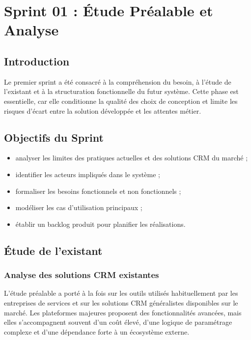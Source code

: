 \chapter{Sprint 01 : Étude Préalable et Analyse}
\minitoc
\newpage

\section{Introduction}
Le premier sprint a été consacré à la compréhension du besoin, à l'étude de l'existant et à la structuration fonctionnelle du futur système. Cette phase est essentielle, car elle conditionne la qualité des choix de conception et limite les risques d'écart entre la solution développée et les attentes métier.

\section{Objectifs du Sprint}
\begin{itemize}
    \item analyser les limites des pratiques actuelles et des solutions CRM du marché ;
    \item identifier les acteurs impliqués dans le système ;
    \item formaliser les besoins fonctionnels et non fonctionnels ;
    \item modéliser les cas d'utilisation principaux ;
    \item établir un backlog produit pour planifier les réalisations.
\end{itemize}

\section{Étude de l'existant}

\subsection{Analyse des solutions CRM existantes}
L'étude préalable a porté à la fois sur les outils utilisés habituellement par les entreprises de services et sur les solutions CRM généralistes disponibles sur le marché. Les plateformes majeures proposent des fonctionnalités avancées, mais elles s'accompagnent souvent d'un coût élevé, d'une logique de paramétrage complexe et d'une dépendance forte à un écosystème externe.\par
\vspace{0.3cm}

